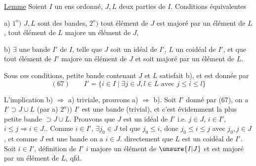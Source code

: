 
\uline{Lemme} Soient $I$ un ens ordonné, $J,L$ deux parties de $I$. Conditions équivalentes

a) $1^{\mathrm o})$ $J,L$ sont des bandes, $2^{\mathrm o})$ tout élément de $J$ est majoré par un élément de $L$, tout élément de $L$ majore un élément de $J$, 

b) $\exists$ une bande $I'$ de $I$, telle que $J$ soit un idéal de $I'$, $L$ un coidéal de $I'$, et que tout élément de $I'$ majore un élément de $J$ et soit majoré par un élément de $L$.

Sous ces conditions,   petite bande  contenant $J$ et $L$ satisfait b), et est donnée par
\[
(67)\qquad I'=\{i\in I\mid\exists j\in J,l\in L\text{ avec }j\leq i\leq l\}
\]

 L'implication b) $\Rightarrow$ a) triviale,  prouvons a) $\Rightarrow$ b). Soit $I'$ donné par (67), on a $I'\supset J\cup L$ (par a) $2^{\mathrm o})$) $I'$ est une bande (trivial), et c'est évidemment la plus petite bande $\supset J\cup L$. Prouvons que $J$ est un idéal de $I'$ i.e. $j\in J$, $i\in I'$, $i\leq j\Rightarrow i\in J$.. Comme $i\in I'$, $\exists j_0\in J$ tel que $j_0\leq i$, donc $j_0\leq i\leq j$ avec $j_0,j\in J$, et comme $J$ est une bande  on a $i\in J$.  directement que $L$ est un coidéal de $I'$. Soit $i\in I'$,  définition de $I'$ $i$ majore un élément de $\unsure{I|J}$ et est majoré par un élément de $L$, qfd.
